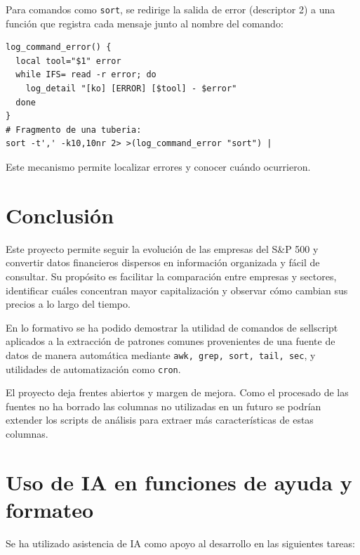 \documentclass[11pt,a4paper]{article}
\begin{document}
Para comandos como \texttt{sort}, se redirige la salida de error
(descriptor 2) a una función que registra cada mensaje junto al
nombre del comando:

\begin{lstlisting}
log_command_error() {
  local tool="$1" error
  while IFS= read -r error; do
    log_detail "[ko] [ERROR] [$tool] - $error"
  done
}
# Fragmento de una tuberia:
sort -t',' -k10,10nr 2> >(log_command_error "sort") |
\end{lstlisting}

Este mecanismo permite localizar errores y conocer cuándo ocurrieron.

\section{Conclusión}

\begingroup

Este proyecto permite seguir la evolución de las empresas del S\&P 500 y convertir datos financieros dispersos en información organizada y fácil de consultar. Su propósito es facilitar la comparación entre empresas y sectores, identificar cuáles concentran mayor capitalización y observar cómo cambian sus precios a lo largo del tiempo.

En lo formativo se ha podido demostrar la utilidad de comandos de sellscript aplicados a la extracción de patrones comunes provenientes de una fuente de datos de manera automática mediante \texttt{awk, grep, sort, tail, sec}, y utilidades de automatización como \texttt{cron}.

El proyecto deja frentes abiertos y margen de mejora. Como el procesado de las fuentes no ha borrado las columnas no utilizadas en un futuro se podrían extender los scripts de análisis para extraer más características de estas columnas.

\par
\endgroup

\newpage
\appendix
\section{Uso de IA en funciones de ayuda y formateo}

Se ha utilizado asistencia de IA como apoyo al desarrollo en las siguientes tareas:
\end{document}
